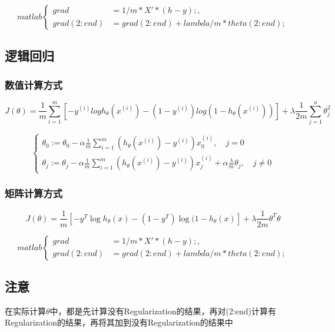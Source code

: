 
\[matlab\begin{cases}
	grad &= 1/m * X'*(h-y); , \quad\\
	grad(2:end) &= grad(2:end) + lambda/m * theta(2:end);
\end{cases}\]



\subsection{逻辑回归}

\subsubsection{数值计算方式}
\begin{equation}
	J(\theta) = \frac{1}{m}
	    \sum_{i=1}^m \left[ -y^{(i)}log{h_\theta(x^{(i)})} - (1-y^{(i)})log{(1-h_\theta(x^{(i)}))} \right]
		+ \lambda \frac{1}{2m} \sum_{j=1}^n\theta_j^2
\end{equation}

\[\begin{cases}
	\theta_0 := \theta_0 - \alpha \frac{1}{m} \sum_{i=1}^m(h_\theta(x^{(i)}) - y^{(i)})x_0^{(i)}, \quad j=0 \\
	\theta_j := \theta_j - \alpha \frac{1}{m} \sum_{i=1}^m(h_\theta(x^{(i)}) - y^{(i)})x_j^{(i)} + \alpha\frac{\lambda}{m}\theta_j, \quad j \neq 0
\end{cases}\]

\subsubsection{矩阵计算方式}
\begin{equation}
		J(\theta) = \frac{1}{m} \left[-y^T \log{h_\theta(x)} - (1-y^T) \log{(1-h_\theta(x)}\right] + \lambda \frac{1}{2m}\theta^T \theta
\end{equation}


\[matlab\begin{cases}
	grad &= 1/m * X'*(h-y); , \quad\\
	grad(2:end) &= grad(2:end) + lambda/m * theta(2:end);
\end{cases}\]



\subsection{注意}
在实际计算$\theta$中，都是先计算没有Regularization的结果，再对(2:end)计算有Regularization的结果，再将其加到没有Regularization的结果中






